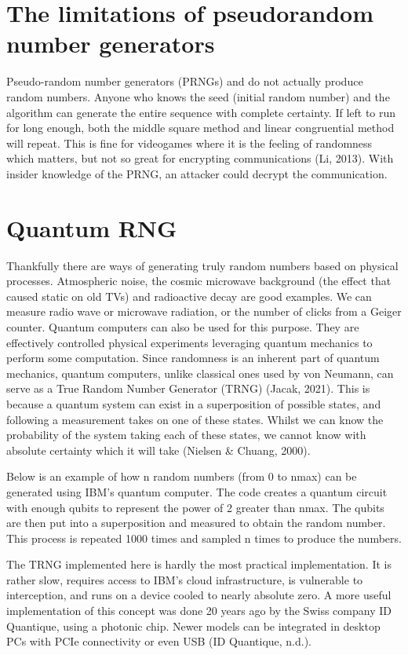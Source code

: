 \documentclass{book}
\begin{document}
\section{The limitations of pseudorandom number generators} 


Pseudo-random number generators (PRNGs) and do not actually produce random numbers. Anyone who knows the seed (initial random number) and the algorithm can generate the entire sequence with complete certainty. If left to run for long enough, both the middle square method and linear congruential method will repeat. This is fine for videogames where it is the feeling of randomness which matters, but not so great for encrypting communications (Li, 2013). With insider knowledge of the PRNG, an attacker could decrypt the communication.

\section{Quantum RNG}

Thankfully there are ways of generating truly random numbers based on physical processes. Atmospheric noise, the cosmic microwave background (the effect that caused static on old TVs) and radioactive decay are good examples. We can measure radio wave or microwave radiation, or the number of clicks from a Geiger counter.
Quantum computers can also be used for this purpose. They are effectively controlled physical experiments leveraging quantum mechanics to perform some computation. Since randomness is an inherent part of quantum mechanics, quantum computers, unlike classical ones used by von Neumann, can serve as a True Random Number Generator (TRNG) (Jacak, 2021). This is because a quantum system can exist in a superposition of possible states, and following a measurement takes on one of these states. Whilst we can know the probability of the system taking each of these states, we cannot know with absolute certainty which it will take (Nielsen \& Chuang, 2000).

Below is an example of how n random numbers (from 0 to nmax) can be generated using IBM’s quantum computer. The code creates a quantum circuit with enough qubits to represent the power of 2 greater than nmax. The qubits are then put into a superposition and measured to obtain the random number. This process is repeated 1000 times and sampled n times to produce the numbers.  

The TRNG implemented here is hardly the most practical implementation. It is rather slow, requires access to IBM’s cloud infrastructure, is vulnerable to interception, and runs on a device cooled to nearly absolute zero. A more useful implementation of this concept was done 20 years ago by the Swiss company ID Quantique, using a photonic chip. Newer models can be integrated in desktop PCs with PCIe connectivity or even USB (ID Quantique, n.d.).
\end{document}
